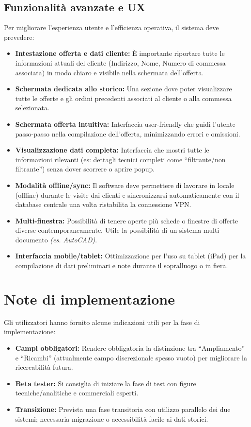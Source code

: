 \subsection{Funzionalità avanzate e UX}
Per migliorare l'esperienza utente e l'efficienza operativa, il sistema deve prevedere:
\begin{itemize}
      \item \textbf{Intestazione offerta e dati cliente:} È importante riportare tutte le informazioni
            attuali del cliente (Indirizzo, Nome, Numero di commessa associata) in modo chiaro e visibile nella
            schermata dell'offerta.
      \item \textbf{Schermata dedicata allo storico:} Una sezione dove poter visualizzare tutte le offerte
            e gli ordini precedenti associati al cliente o alla commessa selezionata.
      \item \textbf{Schermata offerta intuitiva:} Interfaccia user-friendly che guidi l'utente passo-passo
            nella compilazione dell'offerta, minimizzando errori e omissioni.
      \item \textbf{Visualizzazione dati completa:} Interfaccia che mostri tutte le informazioni rilevanti
            (es: dettagli tecnici completi come ``filtrante/non filtrante'') senza dover scorrere o aprire popup.
      \item \textbf{Modalità offline/sync:} Il software deve permettere di lavorare in locale (offline) durante le visite dai clienti
            e sincronizzarsi automaticamente con il database centrale una volta ristabilita la connessione \ac{VPN}.
      \item \textbf{Multi-finestra:} Possibilità di tenere aperte più schede o finestre di offerte diverse contemporaneamente.
            Utile la possibilità di un sistema multi-documento \textit{(es. AutoCAD)}.
      \item \textbf{Interfaccia mobile/tablet:} Ottimizzazione per l'uso su tablet (iPad) per la compilazione
            di dati preliminari e note durante il sopralluogo o in fiera.
\end{itemize}

\section{Note di implementazione}
Gli utilizzatori hanno fornito alcune indicazioni utili per la fase di implementazione:
\begin{itemize}
      \item \textbf{Campi obbligatori:} Rendere obbligatoria la distinzione tra ``Ampliamento'' e ``Ricambi''
            (attualmente campo discrezionale spesso vuoto)
            per migliorare la ricercabilità futura.
      \item \textbf{Beta tester:} Si consiglia di iniziare la fase di test con figure
            tecniche/analitiche e commerciali esperti.
      \item \textbf{Transizione:} Prevista una fase transitoria con utilizzo parallelo dei due sistemi;
            necessaria migrazione o accessibilità facile ai dati storici.
\end{itemize}

